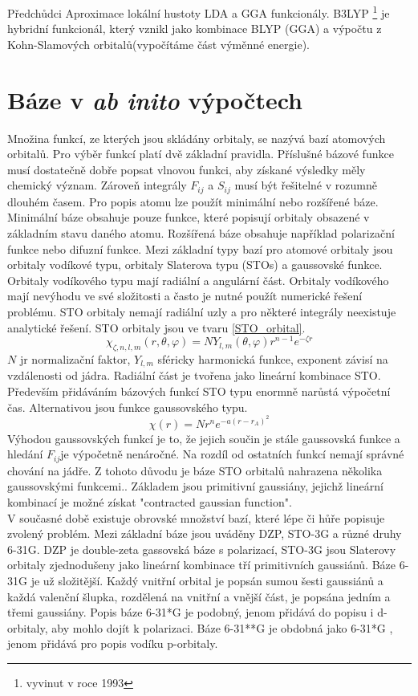 \documentclass[
  digital, %
  table,   %
  lof,     %
  lot,     %
]{fithesis3}
\begin{document}
Předchůdci Aproximace lokální hustoty LDA a GGA funkcionály. B3LYP \footnote{vyvinut v roce 1993} je hybridní funkcionál, který vznikl jako kombinace BLYP (GGA) a výpočtu z Kohn-Slamových orbitalů(vypočítáme část výměnné energie).


\section{Báze v \textit{ab inito} výpočtech }\label{kapitola_baze}
Množina funkcí, ze kterých jsou skládány orbitaly, se nazývá bazí atomových orbitalů. Pro výběr funkcí platí dvě základní pravidla. Příslušné bázové funkce musí dostatečně dobře popsat vlnovou funkci, aby získané výsledky měly chemický význam. Zároveň integrály $F_{ij}$ a $S_{ij}$ musí být řešitelné v rozumně dlouhém časem. \cite{lowe2011quantum}
Pro popis atomu lze použít minimální nebo rozšířené báze. Minimální báze obsahuje pouze funkce, které popisují orbitaly obsazené v základním stavu daného atomu. Rozšířená báze obsahuje například polarizační funkce nebo difuzní funkce. Mezi základní typy bazí pro atomové orbitaly jsou orbitaly vodíkové typu, orbitaly Slaterova typu (STOs) a gaussovské funkce. \cite{dftshrnutivysledky}
Orbitaly vodíkového typu mají radiální a angulární část. Orbitaly vodíkového mají nevýhodu ve své složitosti a často je nutné použít numerické řešení problému. STO orbitaly nemají radiální uzly a pro některé integrály neexistuje analytické řešení. STO orbitaly jsou ve tvaru \ref{STO_orbital}.\cite{jensen2007introduction}
\begin{equation}
\chi_{\zeta, n, l, m}(r, \theta, \varphi) = NY_{l,m} (\theta, \varphi) r^{n-1} e^{-\zeta r}
\label{STO_orbital} 
\end{equation}
$N$ jr normalizační faktor, $Y_{l,m}$ sféricky harmonická funkce, exponent závisí na vzdálenosti od jádra. Radiální část je tvořena jako lineární kombinace STO. Především přidáváním bázových funkcí STO typu enormně narůstá výpočetní čas. Alternativou jsou funkce gaussovského typu.
\begin{equation}
\chi(r) = Nr^n e^{-a(r-r_A)^2}
\end{equation}
 Výhodou gaussovských funkcí je to, že jejich součin je stále gaussovská funkce a hledání $F_{ij}$je výpočetně nenáročné. Na rozdíl od ostatních funkcí nemají správné chování na jádře. Z tohoto důvodu je báze STO orbitalů nahrazena několika gaussovskými funkcemi.\cite{lowe2011quantum}. Základem jsou primitivní gaussiány, jejichž lineární kombinací je možné získat "contracted gaussian function". \\
 V současné době existuje obrovské množství bazí, které lépe či hůře popisuje zvolený problém. Mezi základní báze jsou uváděny DZP, STO-3G a různé druhy 6-31G. DZP je double-zeta gassovská báze s polarizací, STO-3G jsou Slaterovy orbitaly zjednodušeny jako lineární kombinace tří primitivních gaussiánů. Báze 6-31G je už složitější. Každý vnitřní orbital je popsán sumou šesti gaussiánů a každá valenční šlupka, rozdělená na vnitřní a vnější část, je popsána jedním a třemi gaussiány. Popis báze 6-31*G je podobný, jenom přidává do popisu i d-orbitaly, aby mohlo dojít k polarizaci. Báze 6-31**G je obdobná jako 6-31*G , jenom přidává pro popis vodíku p-orbitaly.   
\end{document}

